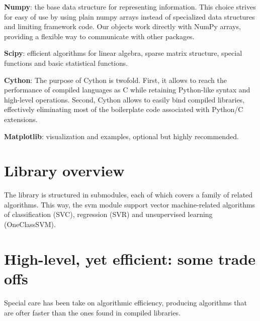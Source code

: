 \documentclass[twoside,11pt]{article}
\begin{document}
{\bf Numpy}:
%
the base data structure for representing
information. This choice strives for easy of use by using plain numpy
arrays instead of specialized data structures and limiting framework
code. Our objects work directly with NumPy arrays, providing a
flexible way to communicate with other packages.

{\bf Scipy}:
%
efficient algorithms for linear algebra, sparse matrix structure, special
functions and basic statistical functions.

{\bf Cython}:
%
The purpose of Cython is twofold. First, it allows to reach the
performance of compiled languages as C while retaining Python-like
syntax and high-level operations. Second, Cython allows to easily bind 
compiled libraries,
effectively eliminating most of the boilerplate code associated with
Python/C extensions.

{\bf Matplotlib}:
%
visualization and examples, optional but highly recommended.




\section{Library overview}

The library is structured in submodules, each of which covers a family
of related algorithms. This way, the svm module support vector
machine-related algorithms of classification (SVC), regression (SVR)
and unsupervised learning (OneClassSVM).

\section{High-level, yet efficient: some trade offs}


Special care has been take on algorithmic efficiency, producing
algorithms that are ofter faster than the ones found in compiled
libraries.
\end{document}

